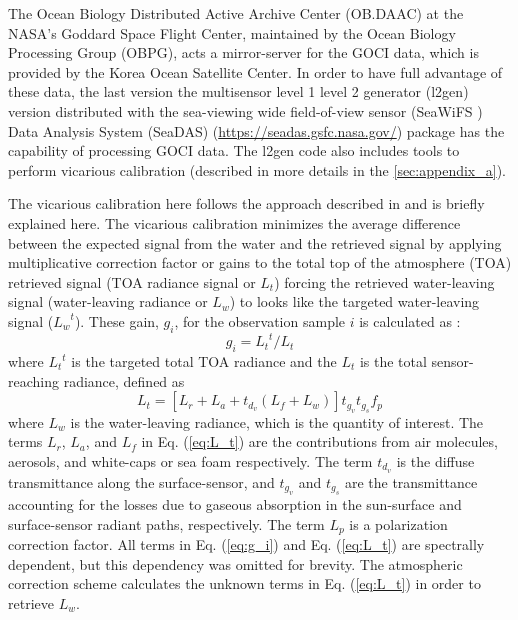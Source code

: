 \documentclass[10pt]{article}
\begin{document}
The Ocean Biology Distributed Active Archive Center (OB.DAAC) at the NASA's Goddard Space Flight Center, maintained by the Ocean Biology Processing Group (OBPG), acts a mirror-server for the GOCI data, which is provided by the Korea Ocean Satellite Center. In order to have full advantage of these data, the last version the multisensor level 1 level 2 generator ({\ttfamily l2gen}) version distributed with the sea-viewing wide field-of-view sensor (SeaWiFS \cite{McClain2004}) Data Analysis System (SeaDAS) (\url{https://seadas.gsfc.nasa.gov/}) package has the capability of processing GOCI data. The {\ttfamily l2gen} code also includes tools to perform vicarious calibration (described in more details in the \autoref{sec:appendix_a}). 

The vicarious calibration here follows the approach described in \cite{Franz:07} and is briefly explained here. The vicarious calibration minimizes the average difference between the expected signal from the water and the retrieved signal by applying multiplicative correction factor or gains to the total top of the atmosphere (TOA) retrieved signal (TOA radiance signal or $L_t$) forcing the retrieved water-leaving signal (water-leaving radiance or $L_w$) to looks like the targeted water-leaving signal (${L_w}^t$). 
These gain, $g_i$, for the observation sample $i$ is calculated as \cite{Franz:07}:
\begin{equation}\label{eq:g_i}
  g_i={L_t}^t/L_t
\end{equation}
where ${L_t}^t$ is the targeted total TOA radiance and the $L_t$ is the total sensor-reaching radiance, defined as
\begin{equation}\label{eq:L_t}
  L_t=[L_r+L_a+t_{d_v}(L_f+L_w)]t_{g_v}t_{g_s}f_p
\end{equation}
where $L_w$ is the water-leaving radiance, which is the quantity of interest. The terms $L_r$, $L_a$, and $L_f$ in Eq. (\ref{eq:L_t}) are the contributions from air molecules, aerosols, and white-caps or sea foam respectively. The term $t_{d_v}$ is the diffuse transmittance along the surface-sensor, and $t_{g_v}$ and $t_{g_s}$  are the transmittance accounting for the losses due to gaseous absorption in the sun-surface and surface-sensor radiant paths, respectively. The term $L_p$ is a polarization correction factor. All terms in Eq. (\ref{eq:g_i}) and Eq. (\ref{eq:L_t}) are spectrally dependent, but this dependency was omitted for brevity\cite{Mobley2016}. The atmospheric correction scheme \cite{Mobley2016} calculates the unknown terms in Eq. (\ref{eq:L_t}) in order to retrieve $L_w$.
\end{document}
